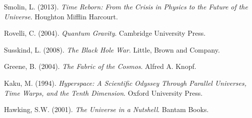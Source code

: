 \documentclass[12pt,a4paper]{article}
\begin{document}
\begin{thebibliography}{99}
Smolin, L. (2013). \textit{Time Reborn: From the Crisis in Physics to the Future of the Universe}. Houghton Mifflin Harcourt.

Rovelli, C. (2004). \textit{Quantum Gravity}. Cambridge University Press.

Susskind, L. (2008). \textit{The Black Hole War}. Little, Brown and Company.

Greene, B. (2004). \textit{The Fabric of the Cosmos}. Alfred A. Knopf.

Kaku, M. (1994). \textit{Hyperspace: A Scientific Odyssey Through Parallel Universes, Time Warps, and the Tenth Dimension}. Oxford University Press.

Hawking, S.W. (2001). \textit{The Universe in a Nutshell}. Bantam Books.

\end{thebibliography}
\end{document}
